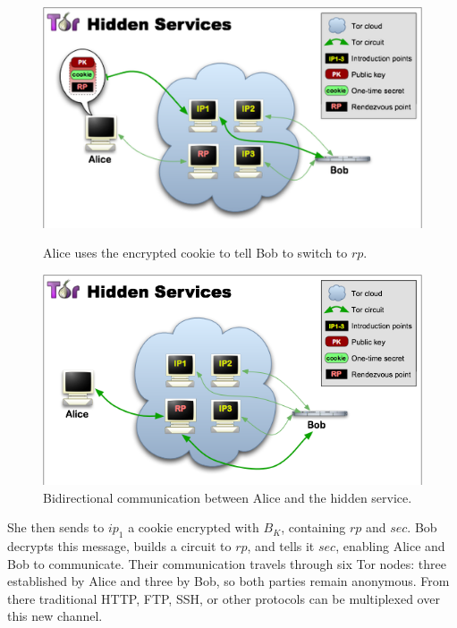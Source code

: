 \begin{figure}[htdp]
	\begin{minipage}[b]{0.45\linewidth}
		\centering
		\includegraphics[width=\textwidth]{images/Tor/tor-hidden-service-4-higher.png}
		\caption{Alice uses the encrypted cookie to tell Bob to switch to $ rp $.}
	\end{minipage}
	\hspace{0.5cm}
	\begin{minipage}[b]{0.45\linewidth}
		\centering
		\includegraphics[width=\textwidth]{images/Tor/tor-hidden-service-6.png}
		\caption{Bidirectional communication between Alice and the hidden service.}
	\end{minipage}
\end{figure}

She then sends to $ ip_{1} $ a cookie encrypted with $ B_{K} $, containing $ rp $ and $ sec $. Bob decrypts this message, builds a circuit to $ rp $, and tells it $ sec $, enabling Alice and Bob to communicate. Their communication travels through six Tor nodes: three established by Alice and three by Bob, so both parties remain anonymous. From there traditional HTTP, FTP, SSH, or other protocols can be multiplexed over this new channel.

